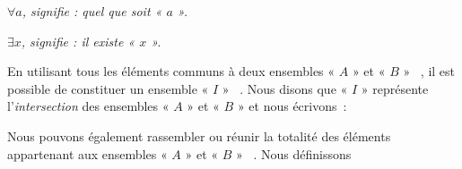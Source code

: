 \medskip

\begin{center}
\textit{$\forall a$, signifie : quel que soit « $a$ ».}

\medskip

\textit{$\exists x$, signifie : il existe « $x$ ».}  
\end{center}

\newpage 

En utilisant tous les éléments communs à deux ensembles « $A$ » et
« $B$ » ~, il est possible de constituer un ensemble « $I$ » ~.
Nous disons que « $I$ » représente l'\textit{intersection} des
ensembles « $A$ » et « $B$ » et nous écrivons~:
\medskip
\begin{center}
\end{center}
\medskip
\begin{center}
\end{center}
\medskip
Nous pouvons également rassembler ou réunir la totalité des éléments
appartenant aux ensembles « $A$ » et « $B$ » ~. Nous définissons
